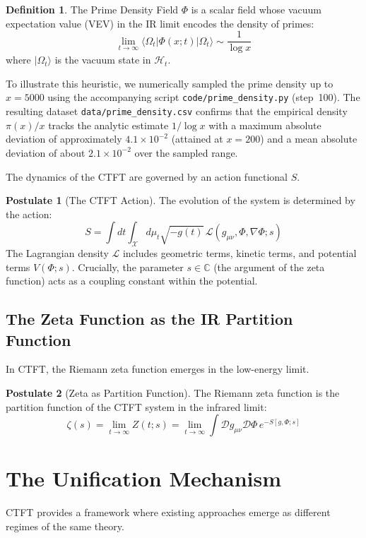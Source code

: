 \documentclass[11pt, a4paper]{article}
\theoremstyle{definition}
\newtheorem{definition}{Definition}[section]
\newtheorem{postulate}{Postulate}
\newcommand{\C}{\mathbb{C}}
\newcommand{\CTS}{\mathcal{X}}
\newcommand{\Lagr}{\mathcal{L}}
\newcommand{\Hilb}{\mathcal{H}}
\begin{document}
\begin{definition}
The Prime Density Field $\Phi$ is a scalar field whose vacuum expectation value (VEV) in the IR limit encodes the density of primes:
$$ \lim_{t\to\infty} \langle \Omega_t | \Phi(x; t) | \Omega_t \rangle \sim \frac{1}{\log x} $$
where $|\Omega_t\rangle$ is the vacuum state in $\Hilb_t$.
\end{definition}

    To illustrate this heuristic, we numerically sampled the prime density up to $x=5000$ using the accompanying script \texttt{code/prime\_density.py} (step~100). The resulting dataset \texttt{data/prime\_density.csv} confirms that the empirical density $\pi(x)/x$ tracks the analytic estimate $1/\log x$ with a maximum absolute deviation of approximately $4.1\times 10^{-2}$ (attained at $x=200$) and a mean absolute deviation of about $2.1\times10^{-2}$ over the sampled range.

The dynamics of the CTFT are governed by an action functional $S$.

\begin{postulate}[The CTFT Action]
The evolution of the system is determined by the action:
$$ S = \int dt \int_{\CTS} d\mu_t \sqrt{-g(t)} \, \Lagr(g_{\mu\nu}, \Phi, \nabla\Phi; s) $$
The Lagrangian density $\Lagr$ includes geometric terms, kinetic terms, and potential terms $V(\Phi; s)$. Crucially, the parameter $s \in \C$ (the argument of the zeta function) acts as a coupling constant within the potential.
\end{postulate}

\subsection{The Zeta Function as the IR Partition Function}
In CTFT, the Riemann zeta function emerges in the low-energy limit.

\begin{postulate}[Zeta as Partition Function]
The Riemann zeta function is the partition function of the CTFT system in the infrared limit:
$$ \zeta(s) = \lim_{t\to\infty} Z(t; s) = \lim_{t\to\infty} \int \mathcal{D}g_{\mu\nu} \mathcal{D}\Phi \, e^{-S[g, \Phi; s]} $$
\end{postulate}

\section{The Unification Mechanism}
CTFT provides a framework where existing approaches emerge as different regimes of the same theory.
\end{document}
